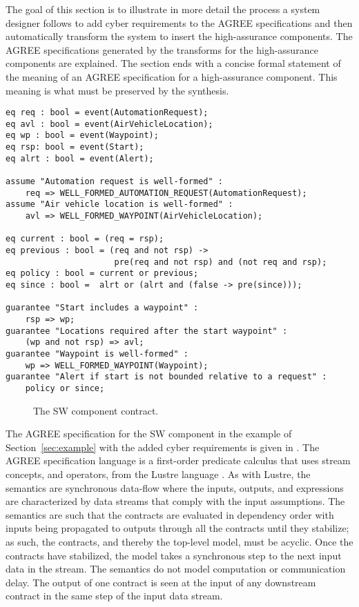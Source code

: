 The goal of this section is to illustrate in more detail the process a
system designer follows to add cyber requirements to the AGREE
specifications and then automatically transform the system to insert
the high-assurance components. The AGREE specifications generated by
the transforms for the high-assurance components are
explained. The section ends with a concise formal statement of the
meaning of an AGREE specification for a high-assurance component. This
meaning is what must be preserved by the synthesis.

\newsavebox{\sw}
\begin{lrbox}{\sw}
\begin{lstlisting}[style=agree]
eq req : bool = event(AutomationRequest);
eq avl : bool = event(AirVehicleLocation);
eq wp : bool = event(Waypoint);
eq rsp: bool = event(Start);
eq alrt : bool = event(Alert);

assume "Automation request is well-formed" :
    req => WELL_FORMED_AUTOMATION_REQUEST(AutomationRequest);
assume "Air vehicle location is well-formed" :
    avl => WELL_FORMED_WAYPOINT(AirVehicleLocation);

eq current : bool = (req = rsp);
eq previous : bool = (req and not rsp) ->
                      pre(req and not rsp) and (not req and rsp);
eq policy : bool = current or previous;
eq since : bool =  alrt or (alrt and (false -> pre(since)));

guarantee "Start includes a waypoint" :
    rsp => wp;
guarantee "Locations required after the start waypoint" :
    (wp and not rsp) => avl;
guarantee "Waypoint is well-formed" :
    wp => WELL_FORMED_WAYPOINT(Waypoint);
guarantee "Alert if start is not bounded relative to a request" :
    policy or since;
\end{lstlisting}
\end{lrbox}

\begin{figure}
  \begin{center}
    \scalebox{0.60}{\usebox{\sw}}
  \end{center}
  \caption{The SW component contract.}
  \label{fig:sw}
\end{figure}

The AGREE specification for the SW component in the example of Section~\ref{sec:example} with the added cyber requirements is given in . The AGREE specification language is a first-order predicate calculus that uses stream concepts, and operators, from the Lustre language \cite{10.1145/41625.41641}. As with Lustre, the semantics are synchronous data-flow where the inputs, outputs, and expressions are characterized by data streams that comply with the input assumptions. The semantics are such that the contracts are evaluated in dependency order with inputs being propagated to outputs through all the contracts until they stabilize; as such, the contracts, and thereby the top-level model, must be acyclic. Once the contracts have stabilized, the model takes a synchronous step to the next input data in the stream. The semantics do not model computation or communication delay. The output of one contract is seen at the input of any downstream contract in the same step of the input data stream.

